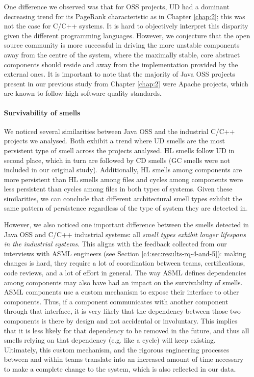 One difference we observed was that for OSS projects, UD had a dominant decreasing trend for its PageRank characteristic as in Chapter \ref{chap:2}; this was not the case for C/C++ systems.
It is hard to objectively interpret this disparity given the different programming languages. However, we conjecture that the open source community is more successful in driving the more unstable components away from the centre of the system, where the maximally stable, core abstract components should reside \cite{Martin2018} and away from the implementation provided by the external ones.
It is important to note that the majority of Java OSS projects present in our previous study from Chapter \ref{chap:2} were Apache projects, which are known to follow high software quality standards.

\paragraph{Survivability of smells}
We noticed several similarities between Java OSS and the industrial C/C++ projects we analysed.
Both exhibit a trend where UD smells are the most persistent type of smell across the projects analysed.
HL smells follow UD in second place, which in turn are followed by CD smells (GC smells were not included in our original study).
Additionally, HL smells among components are more persistent than HL smells among files and cycles among components were less persistent than cycles among files in both types of systems.
Given these similarities, we can conclude that different architectural smell types exhibit the same pattern of persistence regardless of the type of system they are detected in.

However, we also noticed one important difference between the smells detected in Java OSS and C/C++ industrial systems: all \emph{smell types exhibit longer lifespans in the industrial systems}. 
This aligns with the feedback collected from our interviews with ASML engineers (see Section \ref{c4:sec:results-rq-4-and-5}): making changes is hard, they require a lot of coordination between teams, certifications, code reviews, and a lot of effort in general.
The way ASML defines dependencies among components may also have had an impact on the survivability of smells. ASML components use a custom mechanism to expose their interface to other components. Thus, if a component communicates with another component through that interface, it is very likely that the dependency between those two components is there by design and not accidental or involuntary. This implies that it is less likely for that dependency to be removed in the future, and thus all smells relying on that dependency (e.g. like a cycle) will keep existing.
Ultimately, this custom mechanism, and the rigorous engineering processes between and within teams translate into an increased amount of time necessary to make a complete change to the system, which is also reflected in our data.

